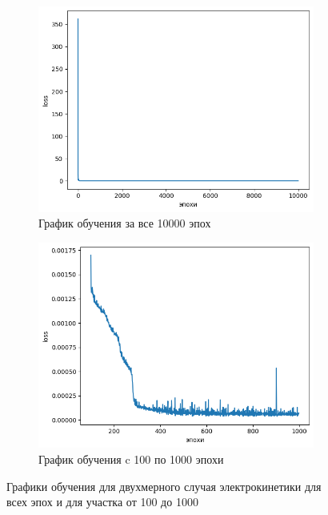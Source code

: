 \documentclass[a4paper,14pt]{extarticle} %
\begin{document}
\begin{figure}[h]
    \begin{subfigure}{0.49\textwidth}
        \center
        \includegraphics[width=\textwidth]{../plots/ek/2-dim loss 20x4.png}
        \caption{График обучения за все 10000 эпох}
        \label{fig:2dloss}
    \end{subfigure}
    \hfill
    \begin{subfigure}{0.49\textwidth}
        \center
        \includegraphics[width=\textwidth]{../plots/ek/2-dim loss trim20x4.png}
        \caption{График обучения c 100 по 1000 эпохи}
        \label{fig:2dloss_trim}
    \end{subfigure}
    \caption{Графики обучения для двухмерного случая электрокинетики для всех эпох и для участка от 100 до 1000}
\end{figure}
\end{document}
